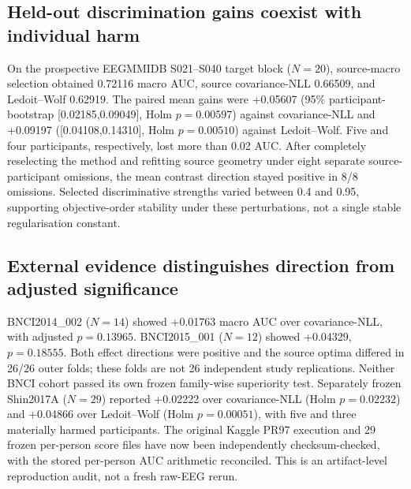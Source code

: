 \documentclass[11pt,a4paper]{article}
\begin{document}
\subsection{Held-out discrimination gains coexist with individual harm}
On the prospective EEGMMIDB S021--S040 target block (\(N=20\)),
source-macro selection obtained 0.72116 macro AUC, source
covariance-NLL 0.66509, and Ledoit--Wolf 0.62919.
The paired mean gains were +0.05607 (95\% participant-bootstrap
[0.02185,0.09049], Holm \(p=0.00597\)) against covariance-NLL and
+0.09197 ([0.04108,0.14310], Holm \(p=0.00510\)) against
Ledoit--Wolf. Five and four participants, respectively, lost more
than 0.02 AUC. After completely reselecting the method and refitting
source geometry under eight separate source-participant omissions,
the mean contrast direction stayed positive in 8/8 omissions.
Selected discriminative strengths varied between 0.4 and 0.95,
supporting objective-order stability under these perturbations,
not a single stable regularisation constant.

\subsection{External evidence distinguishes direction from adjusted significance}
BNCI2014\_002 (\(N=14\)) showed +0.01763 macro AUC over
covariance-NLL, with adjusted \(p=0.13965\).
BNCI2015\_001 (\(N=12\)) showed +0.04329, \(p=0.18555\).
Both effect directions were positive and the source optima differed in
26/26 outer folds; these folds are not 26 independent study replications.
Neither BNCI cohort passed its own frozen family-wise superiority test.
Separately frozen Shin2017A (\(N=29\)) reported +0.02222 over
covariance-NLL (Holm \(p=0.02232\)) and +0.04866 over Ledoit--Wolf
(Holm \(p=0.00051\)), with five and three materially harmed
participants. The original Kaggle PR97 execution and 29 frozen per-person
score files have now been independently checksum-checked, with
the stored per-person AUC arithmetic reconciled. This is
an artifact-level reproduction audit, not a fresh raw-EEG rerun.











\end{document}
